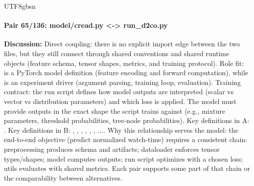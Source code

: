 \documentclass[11pt]{article}
\begin{document}
\begin{CJK*}{UTF8}{gbsn}
\paragraph{Pair 65/136: model/cread.py <-> run\_d2co.py}
\textbf{Discussion:} Direct coupling: there is no explicit import edge between the two files, but they still connect through shared conventions and shared runtime objects (feature schema, tensor shapes, metrics, and training protocol). Role fit: \texttt{} is a PyTorch model definition (feature encoding and forward computation), while \texttt{} is an experiment driver (argument parsing, training loop, evaluation). Training contract: the run script defines how model outputs are interpreted (scalar vs vector vs distribution parameters) and which loss is applied. The model must provide outputs in the exact shape the script trains against (e.g., mixture parameters, threshold probabilities, tree-node probabilities). Key definitions in A: \texttt{}. Key definitions in B: \texttt{}, \texttt{}, \texttt{}, \texttt{}, \texttt{}, \texttt{}, .... Why this relationship serves the model: the end-to-end objective (predict normalized watch-time) requires a consistent chain: preprocessing produces schema and artifacts; dataloader enforces tensor types/shapes; model computes outputs; run script optimizes with a chosen loss; utils evaluates with shared metrics. Each pair supports some part of that chain or the comparability between alternatives.


\end{CJK*}
\end{document}

